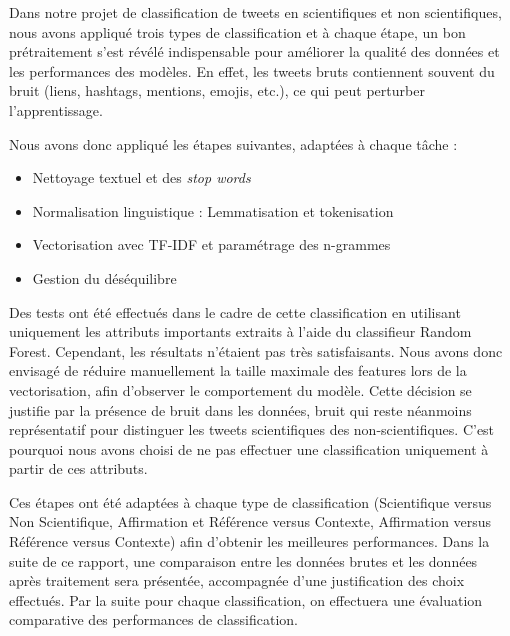 Dans notre projet de classification de tweets en scientifiques et non scientifiques, nous avons appliqué trois types de classification et à chaque étape, un bon prétraitement s’est révélé indispensable pour améliorer la qualité des données et les performances des modèles.
En effet, les tweets bruts contiennent souvent du bruit (liens, hashtags, mentions, emojis, etc.), ce qui peut perturber l’apprentissage.

Nous avons donc appliqué les étapes suivantes, adaptées à chaque tâche :
\begin{itemize}
    \item Nettoyage textuel et des \textit{stop words}
    \item Normalisation linguistique : Lemmatisation et tokenisation
    \item Vectorisation avec TF-IDF et paramétrage des n-grammes
    \item Gestion du déséquilibre
\end{itemize}

Des tests ont été effectués dans le cadre de cette classification en utilisant uniquement les attributs importants extraits à l’aide du classifieur Random Forest.
Cependant, les résultats n’étaient pas très satisfaisants.
Nous avons donc envisagé de réduire manuellement la taille maximale des features lors de la vectorisation, afin d’observer le comportement du modèle.
Cette décision se justifie par la présence de bruit dans les données, bruit qui reste néanmoins représentatif pour distinguer les tweets scientifiques des non-scientifiques.
C’est pourquoi nous avons choisi de ne pas effectuer une classification uniquement à partir de ces attributs.

Ces étapes ont été adaptées à chaque type de classification (Scientifique versus Non Scientifique, Affirmation et Référence versus Contexte, Affirmation versus Référence versus Contexte) afin d’obtenir les meilleures performances.
Dans la suite de ce rapport, une comparaison entre les données brutes et les données après traitement sera présentée, accompagnée d’une justification des choix effectués.
Par la suite pour chaque classification, on effectuera une évaluation comparative des performances de classification.
